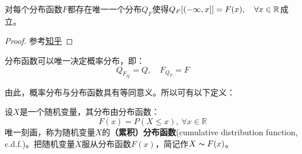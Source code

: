 \begin{proposition}
    对每个分布函数$F$都存在唯一一个分布$Q_F$使得$Q_F[(-\infty,x]]=F(x), \quad \forall x \in \mathbb{R}$成立。
\end{proposition}
\begin{proof}
    参考\href{https://www.zhihu.com/question/23022012/answer/2520636971}{知乎}
\end{proof}

\begin{theorem}
    分布函数可以唯一决定概率分布，即：
    \[ Q_{F_Q}=Q, \quad F_{Q_F}=F \]
\end{theorem}
由此，概率分布与分布函数具有等同意义。所以可有以下定义：
\begin{definition}[随机变量的分布函数]
    设$X$是一个随机变量，其分布由分布函数：
    \[ F(x)=P(X \leq x),\ \forall x \in \mathbb{R} \]
    唯一刻画，称为随机变量$X$的\textbf{（累积）分布函数}(cumulative distribution function, c.d.f.)。把随机变量$X$服从分布函数$F(x)$，简记作$X \thicksim F(x)$。
\end{definition}


